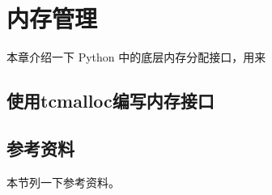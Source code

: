 \chapter{内存管理}

本章介绍一下 Python 中的底层内存分配接口，用来


\section{使用tcmalloc编写内存接口}


\section{参考资料}

本节列一下参考资料。
